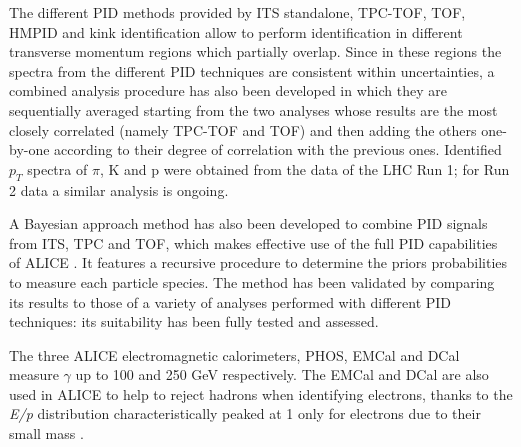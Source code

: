 \documentclass[10pt]{article}
\begin{document}
The different PID methods provided by ITS standalone, TPC-TOF, TOF, HMPID and kink identification allow to perform identification in different transverse momentum regions which partially overlap. Since  in these regions the spectra from the different PID techniques are consistent within uncertainties, 
a combined analysis procedure has also been developed \cite{ref:comb} in which 
they are sequentially averaged starting from the two analyses whose results are the most closely correlated (namely TPC-TOF and TOF) and then adding the others one-by-one according to their degree of correlation with the previous ones. Identified $p_{T}$ spectra of $\pi$, K and p were obtained from the data of the LHC Run 1; for Run 2 data a similar analysis is ongoing.

A Bayesian approach method has also been developed to combine PID signals from ITS, TPC and 
TOF, which makes effective use of the full PID capabilities of ALICE \cite{ref:bayes}. It features a recursive procedure to determine the priors probabilities to measure each particle species. The method has been validated by comparing its results to those of a variety of analyses performed with different PID techniques: its suitability has been fully tested and assessed. 

The three ALICE electromagnetic calorimeters, PHOS, EMCal and DCal measure $\gamma$ up to 100 and 250 GeV respectively. The EMCal and DCal are also used in ALICE to help to reject hadrons when identifying electrons, thanks to the {\it E/p} distribution characteristically peaked at 1 only for electrons due to their small mass \cite{ref:perf}. 
\end{document}
